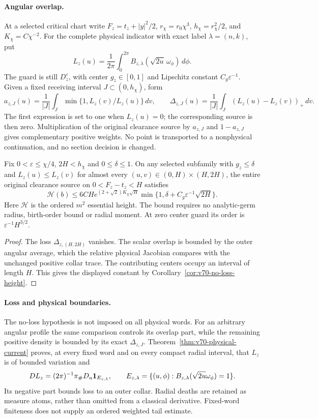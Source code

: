 \paragraph{Angular overlap.}
At a selected critical chart write $F_z=t_z+|y|^2/2$,
$r_\chi=r_0\chi^3$, $h_\chi=r_\chi^2/2$, and $K_\chi=C\chi^{-2}$.
For the complete physical indicator with exact label $\lambda=(n,k)$,
put
\[
 L_z(u)=\frac1{2\pi}\int_0^{2\pi}
                 B_{z,\lambda}(\sqrt{2u}\,\omega_\phi)\,d\phi.
\]
The guard is still $D_z^\varepsilon$, with center $g_z\in[0,1]$
and Lipschitz constant $C_g\varepsilon^{-1}$. Given a fixed receiving
interval $J\subset(0,h_\chi)$, form
\[
 a_{z,J}(u)=\frac1{|J|}\int_J\min\{1,L_z(v)/L_z(u)\}\,dv,
 \qquad
 \Delta_{z,J}(u)=\frac1{|J|}\int_J(L_z(u)-L_z(v))_+\,dv.
\]
The first expression is set to one when $L_z(u)=0$; the corresponding
source is then zero. Multiplication of the original clearance source
by $a_{z,J}$ and $1-a_{z,J}$ gives complementary positive weights.
No point is transported to a nonphysical continuation, and no section
decision is changed.

\newpage
\begin{leadtheorem}
\label{thm:intro-v70-no-loss}
Fix $0<\varepsilon\le\chi/4$, $2H<h_\chi$ and $0\le\delta\le1$.
On any selected subfamily with $g_z\le\delta$ and
$L_z(u)\le L_z(v)$ for almost every $(u,v)\in(0,H)\times(H,2H)$,
the entire original clearance source on $0<F_z-t_z<H$ satisfies
\[
 \mathcal H(b)\le6CH e^{(2+\sqrt2)K_\chi\sqrt H}
       \min\{1,\delta+C_g\varepsilon^{-1}\sqrt{2H}\}.
\]
Here $\mathcal H$ is the ordered $m^2$ essential height. The bound
requires no analytic-germ radius, birth-order bound or radial moment.
At zero center guard its order is $\varepsilon^{-1}H^{3/2}$.
\end{leadtheorem}
\begin{proof}
The loss $\Delta_{z,(H,2H)}$ vanishes. The scalar overlap is bounded
by the outer angular average, which the relative physical Jacobian
compares with the unchanged positive collar trace. The contributing
centers occupy an interval of length $H$. This gives the displayed
constant by Corollary~\ref{cor:v70-no-loss-height}.
\end{proof}

\paragraph{Loss and physical boundaries.}
The no-loss hypothesis is not imposed on all physical words. For an
arbitrary angular profile the same comparison controls its overlap
part, while the remaining positive density is bounded by its exact
$\Delta_{z,J}$. Theorem~\ref{thm:v70-physical-current} proves, at
every fixed word and on every compact radial interval, that $L_z$ is
of bounded variation and
\[
 DL_z=(2\pi)^{-1}\pi_\#D_u\mathbf1_{E_{z,\lambda}},
 \qquad E_{z,\lambda}=\{(u,\phi):B_{z,\lambda}(\sqrt{2u}\omega_\phi)=1\}.
\]
Its negative part bounds loss to an outer collar. Radial deaths are
retained as measure atoms, rather than omitted from a classical
derivative. Fixed-word finiteness does not supply an ordered weighted
tail estimate.

